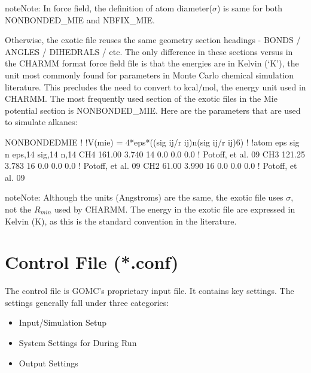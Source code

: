 \documentclass[letterpaper,10pt,english]{sphinxmanual}
\begin{document}
\begin{sphinxadmonition}{note}{Note:}
In  force field, the definition of atom diameter(\(\sigma\)) is same for both NONBONDED\_MIE and NBFIX\_MIE.
\end{sphinxadmonition}

Otherwise, the exotic file reuses the same geometry section headings - BONDS / ANGLES / DIHEDRALS / etc. The only difference in these sections versus in the CHARMM format force field file is that the energies are in Kelvin (‘K’), the unit most commonly found for parameters in Monte Carlo chemical simulation literature. This precludes the need to convert to kcal/mol, the energy unit used in CHARMM.
The most frequently used section of the exotic files in the Mie potential section is NONBONDED\_MIE. Here are the parameters that are used to simulate alkanes:

%
\begin{sphinxVerbatim}[commandchars=\\\{\}]
NONBONDED\PYGZus{}MIE
!
!V(mie) = 4*eps*((sig ij/r ij)\PYGZca{}n\PYGZhy{}(sig ij/r ij)\PYGZca{}6)
!
!atom eps sig n eps,1\PYGZhy{}4 sig,1\PYGZhy{}4 n,1\PYGZhy{}4
CH4 161.00 3.740 14 0.0 0.0 0.0 ! Potoff, et al. \PYGZsq{}09
CH3 121.25 3.783 16 0.0 0.0 0.0 ! Potoff, et al. \PYGZsq{}09
CH2  61.00 3.990 16 0.0 0.0 0.0 ! Potoff, et al. \PYGZsq{}09
\end{sphinxVerbatim}

\begin{sphinxadmonition}{note}{Note:}
Although the units (Angstroms) are the same, the exotic file uses \(\sigma\), not the \(R_{min}\) used by CHARMM. The energy in the exotic file are expressed in Kelvin (K), as this is the standard convention in the literature.
\end{sphinxadmonition}


\section{Control File (*.conf)}
\label{\detokenize{input_file:control-file-conf}}
The control file is GOMC’s proprietary input file. It contains key settings. The settings generally fall under three categories:
\begin{itemize}
\item {} 
Input/Simulation Setup

\item {} 
System Settings for During Run

\item {} 
Output Settings

\end{itemize}
\end{document}

